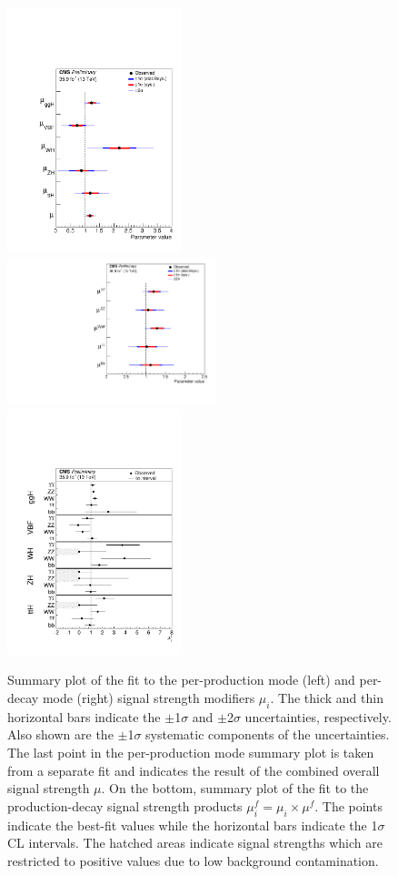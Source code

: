 \begin{figure}[htbp]
\centering
\includegraphics[width=0.45\textwidth]{Images/MuI}
\includegraphics[width=0.54\textwidth]{Images/MuF}
\includegraphics[width=0.45\textwidth]{Images/MuIeMuF}
\caption{Summary plot of the fit to the per-production mode (left) and per-decay mode (right) signal strength modifiers $\mu_i$. The thick and thin horizontal bars indicate the $\pm$1$\sigma$ and $\pm$2$\sigma$ uncertainties, respectively. Also shown are the $\pm$1$\sigma$ systematic components of the uncertainties. The last point in the per-production mode summary plot is taken from a separate fit and indicates the result of the combined overall signal strength $\mu$. On the bottom, summary plot of the fit to the production-decay signal strength products $\mu^f_i = \mu_i \times \mu^f$. The points indicate the best-fit values while the horizontal bars indicate the 1$\sigma$ CL intervals. The hatched areas indicate signal strengths which are restricted to positive values due to low background contamination.}
\label{SignalStrength}
\end{figure}
